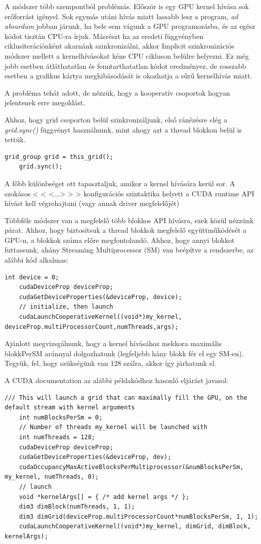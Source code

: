 A módszer több szempontból problémás. Először is egy GPU kernel hívása sok erőforrást igényel. Sok egymás utáni hívás miatt lassabb lesz a program, \textit{ad absurdum} jobban járunk, ha bele sem vágunk a GPU programozásba, és az egész kódot tisztán CPU-ra írjuk. Másrészt ha az eredeti függvényben ciklusiterációnként akarnánk szinkronizálni, akkor Implicit szinkronizációs módszer mellett a kernelhívásokat kéne CPU cikluson belülre helyezni. Ez még jobb esetben átláthatatlan és fenntarthatatlan kódot eredményez, de rosszabb esetben a grafikus kártya meghibásodását is okozhatja a sűrű kernelhívás miatt. 

A probléma tehát adott, de nézzük, hogy a kooperatív csoportok hogyan jelentenek erre megoldást.

Ahhoz, hogy grid csoporton belül szinkronizáljunk, első ránézésre elég a \textit{grid.sync()} függvényt használnunk, mint ahogy azt a thread blokkon belül is tettük.

\begin{lstlisting}[style=CStyle]
	grid_group grid = this_grid();
	grid.sync();
\end{lstlisting}

A főbb különbséget ott tapasztaljuk, amikor a kernel hívására kerül sor. A szokásos < < <...> > > konfigurációs szintaktika helyett a CUDA runtime API hívást kell végrehajtani (vagy annak driver megfelelőjét) \cite{CooperativeLaunchkernel}

Többféle módszer van a megfelelő több blokkos API hívásra, ezek közül nézzünk párat.
Ahhoz, hogy biztosítsuk a thread blokkok megfelelő együttműködését a GPU-n, a blokkok száma előre megfontolandó. Ahhoz, hogy annyi blokkot futtassunk, ahány Streaming Multiprocessor (SM) van beépítve a rendszerbe, az alábbi kód alkalmas:
\begin{lstlisting}[style=CStyle]
	int device = 0;
	cudaDeviceProp deviceProp;
	cudaGetDeviceProperties(&deviceProp, device);
	// initialize, then launch
	cudaLaunchCooperativeKernel((void*)my_kernel, deviceProp.multiProcessorCount,numThreads,args);
\end{lstlisting}

Ajánlott megvizsgálnunk, hogy a kernel hívásához mekkora maximális blokkPerSM aránnyal dolgozhatunk (legfeljebb hány blokk fér el egy SM-en). Tegyük, fel, hogy szükségünk van 128 szálra, akkor így járhatunk el. 

A CUDA documentation az alábbi példakódhoz hasonló eljárást javasol:

\begin{lstlisting}[style=CStyle]
	/// This will launch a grid that can maximally fill the GPU, on the default stream with kernel arguments
	int numBlocksPerSm = 0;
	// Number of threads my_kernel will be launched with
	int numThreads = 128;
	cudaDeviceProp deviceProp;
	cudaGetDeviceProperties(&deviceProp, dev);
	cudaOccupancyMaxActiveBlocksPerMultiprocessor(&numBlocksPerSm, my_kernel, numThreads, 0);
	// launch
	void *kernelArgs[] = { /* add kernel args */ };
	dim3 dimBlock(numThreads, 1, 1);
	dim3 dimGrid(deviceProp.multiProcessorCount*numBlocksPerSm, 1, 1);
	cudaLaunchCooperativeKernel((void*)my_kernel, dimGrid, dimBlock, kernelArgs);
\end{lstlisting}

